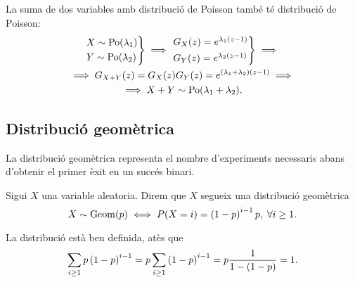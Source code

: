 \begin{obs} La suma de dos variables amb distribució de Poisson també té distribució de Poisson:
    \begin{gather*}
    \begin{rcases*} X \sim \operatorname{Po}(\lambda_1) \\ Y \sim \operatorname{Po}(\lambda_2) \end{rcases*} \implies
    \begin{rcases*} G_X(z) = e^{\lambda_1(z-1)} \\ G_Y(z) = e^{\lambda_2(z-1)} \end{rcases*}
    \implies \\
    \implies G_{X+Y}(z) = G_X(z)G_Y(z) = e^{(\lambda_1+\lambda_2)(z-1)} \implies \\
    \implies X+Y \sim \operatorname{Po}(\lambda_1+\lambda_2).
    \end{gather*}
\end{obs}

\subsection*{Distribució geomètrica}
La distribució geomètrica representa el nombre d'experiments necessaris abans d'obtenir el primer èxit en un succés binari.
\begin{defi}
    Sigui $X$ una variable aleatoria. Direm que $X$ segueix una distribució geomètrica
    \[X \sim \operatorname{Geom}(p) \iff P(X=i) = \left( 1-p \right) ^{i-1}p,\;\forall i\geq1.\]
\end{defi}

\begin{obs}
    La distribució està ben definida, atès que
    \[
        \sum_{i\geq 1} p\left(1-p\right)^{i-1} = p\sum_{i\geq 1}\left(1-p\right)^{i-1} = p\frac{1}{1-\left( 1-p\right)}=1.
    \]
\end{obs}

